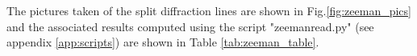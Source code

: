 \documentclass[11pt,a4paper]{article}
\begin{document}
      The pictures taken of the split diffraction lines are shown in Fig.\ref{fig:zeeman_pics} and the associated results computed using the script "zeemanread.py" (see appendix \ref{app:scripts}) are shown in Table \ref{tab:zeeman_table}.

      \begin{figure}[H]
          \center
           \\

\end{figure}
\end{document}
